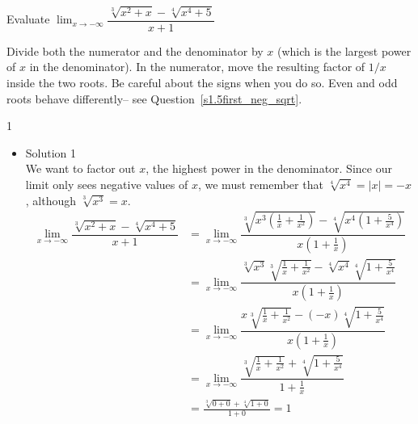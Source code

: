 \begin{question}Evaluate
$\displaystyle\lim_{x \rightarrow -\infty}\dfrac{\sqrt[3]{x^2+x}-\sqrt[4]{x^4+5}}{x+1}$
\end{question}
\begin{hint}
Divide both the numerator and the denominator by $x$
         (which is the largest power of $x$ in the denominator).
         In the numerator, move the resulting factor of $1/x$ inside
         the two roots. Be careful about the signs when you do so.
         Even and odd roots behave differently-- see Question~\ref{s1.5first_neg_sqrt}.
\end{hint}
\begin{answer} 1
\end{answer}
\begin{solution}
\begin{itemize}
\item Solution 1\\
We want to factor out $x$, the highest power in the denominator. Since our limit only sees negative values of $x$, we must remember that $\sqrt[4]{x^4}=|x|=-x$, although $\sqrt[3]{x^3}=x$.
\begin{align*}
\lim_{x \rightarrow -\infty}\dfrac{\sqrt[3]{x^2+x}-\sqrt[4]{x^4+5}}{x+1}&=
\lim_{x \rightarrow -\infty}\dfrac{\sqrt[3]{x^3(\frac{1}{x}+\frac{1}{x^2})}-\sqrt[4]{x^4(1+\frac{5}{x^4})}}{x(1+\frac{1}{x})}\\&=
\lim_{x \rightarrow -\infty}\dfrac{\sqrt[3]{x^3}\sqrt[3]{\frac{1}{x}+\frac{1}{x^2}}-\sqrt[4]{x^4}\sqrt[4]{1+\frac{5}{x^4}}}{x(1+\frac{1}{x})}
\\&=\lim_{x \rightarrow -\infty}\dfrac{x\sqrt[3]{\frac{1}{x}+\frac{1}{x^2}}-(-x)\sqrt[4]{1+\frac{5}{x^4}}}{x(1+\frac{1}{x})}
\\&=\lim_{x \rightarrow -\infty}\dfrac{\sqrt[3]{\frac{1}{x}+\frac{1}{x^2}}+\sqrt[4]{1+\frac{5}{x^4}}}{1+\frac{1}{x}}\\
&=\frac{\sqrt[3]{0+0}+\sqrt[4]{1+0}}{1+0}=1
\end{align*}


\end{itemize}
\end{solution}
